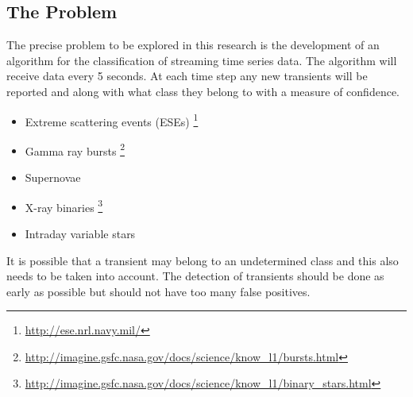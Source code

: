 	\subsection{The Problem}
	The precise problem to be explored in this research is the development of an algorithm for the classification of streaming time series data. The algorithm will receive data every 5 seconds. At each time step any new transients will be reported and along with what class they belong to with a measure of confidence.
		\begin{itemize}
		\item Extreme scattering events (ESEs) \footnote{\url{http://ese.nrl.navy.mil/}}
		\item Gamma ray bursts \footnote{\url{http://imagine.gsfc.nasa.gov/docs/science/know_l1/bursts.html}}
		\item Supernovae
		\item X-ray binaries \footnote{\url{http://imagine.gsfc.nasa.gov/docs/science/know_l1/binary_stars.html}}
		\item Intraday variable stars
	\end{itemize}
	It is possible that a transient may belong to an undetermined class and this also needs to be taken into account. The detection of transients should be done as early as possible but should not have too many false positives.
	
